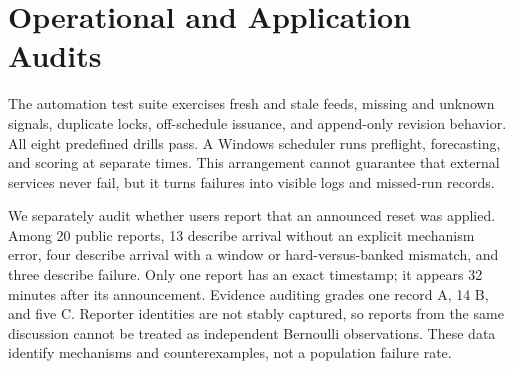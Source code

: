 \section{Operational and Application Audits}

The automation test suite exercises fresh and stale feeds, missing and unknown signals, duplicate
locks, off-schedule issuance, and append-only revision behavior. All eight predefined drills pass.
A Windows scheduler runs preflight, forecasting, and scoring at separate times. This arrangement
cannot guarantee that external services never fail, but it turns failures into visible logs and
missed-run records.

We separately audit whether users report that an announced reset was applied. Among 20 public
reports, 13 describe arrival without an explicit mechanism error, four describe arrival with a
window or hard-versus-banked mismatch, and three describe failure. Only one report has an exact
timestamp; it appears 32 minutes after its announcement. Evidence auditing grades one record A,
14 B, and five C. Reporter identities are not stably captured, so reports from the same discussion
cannot be treated as independent Bernoulli observations. These data identify mechanisms and
counterexamples, not a population failure rate.
